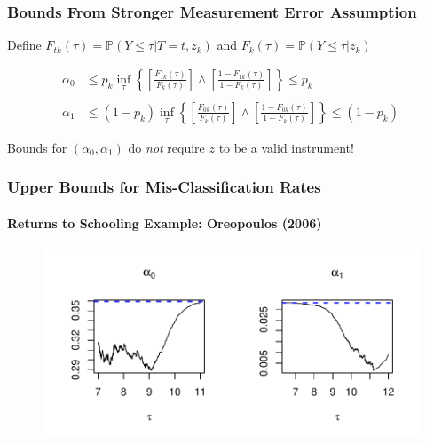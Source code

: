 \documentclass{beamer}
\begin{document}
\begin{frame}
  \frametitle{Bounds From Stronger Measurement Error Assumption}
  Define $F_{tk}(\tau) = \mathbb{P}(Y \leq \tau|T=t, z_k)$ and $F_k(\tau) = \mathbb{P}(Y \leq \tau|z_k)$

\begin{align*}
  \alpha_0 &\leq p_k \inf_\tau\left\{\left[\frac{F_{1k}(\tau)}{F_k(\tau)}\right] \wedge \left[\frac{1-F_{1k}(\tau)}{1 - F_k(\tau)} \right]\right\} \leq p_k \\ \\
  \alpha_1 &\leq (1 - p_k) \inf_\tau \left\{\left[\frac{F_{0k}(\tau)}{F_k(\tau)}\right] \wedge \left[\frac{1-F_{0k}(\tau)}{1 - F_k(\tau)} \right]\right\} \leq (1 - p_k) 
\end{align*}

\vspace{1em}
\alert{Bounds for $(\alpha_0, \alpha_1)$ do \emph{not} require $z$ to be a valid instrument!}
\end{frame}
\begin{frame}
  \frametitle{Upper Bounds for Mis-Classification Rates}
  \framesubtitle{Returns to Schooling Example: Oreopoulos (2006)}
  \begin{figure}[h]
    \centering
    \includegraphics[width=\textwidth]{Oreo_CDFbounds}
  \end{figure}
\end{frame}
\end{document}

